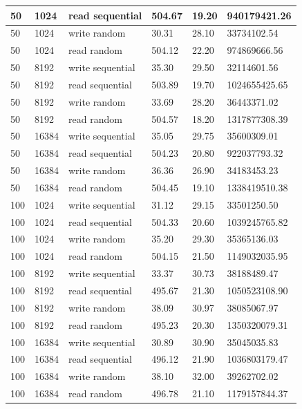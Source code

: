 \begin{tabularx}{\textwidth}{|X|X|X|X|X|X|}
    50 & 1024 & read sequential & 504.67 & 19.20 & 940179421.26 \\
    \hline
    50 & 1024 & write random & 30.31 & 28.10 & 33734102.54 \\
    \hline
    50 & 1024 & read random & 504.12 & 22.20 & 974869666.56 \\
    \hline
    \hline
    \rowcolor{lightgray} 50 & 8192 & write sequential & 35.30 & 29.50 & 32114601.56 \\
    \hline
    \rowcolor{lightgray} 50 & 8192 & read sequential & 503.89 & 19.70 & 1024655425.65 \\
    \hline
    \rowcolor{lightgray} 50 & 8192 & write random & 33.69 & 28.20 & 36443371.02 \\
    \hline
    \rowcolor{lightgray} 50 & 8192 & read random & 504.57 & 18.20 & 1317877308.39 \\
    \hline
    \hline
    50 & 16384 & write sequential & 35.05 & 29.75 & 35600309.01 \\
    \hline
    50 & 16384 & read sequential & 504.23 & 20.80 & 922037793.32 \\
    \hline
    50 & 16384 & write random & 36.36 & 26.90 & 34183453.23 \\
    \hline
    50 & 16384 & read random & 504.45 & 19.10 & 1338419510.38 \\
    \hline
    \hline
    \rowcolor{lightgray} 100 & 1024 & write sequential & 31.12 & 29.15 & 33501250.50 \\
    \hline
    \rowcolor{lightgray} 100 & 1024 & read sequential & 504.33 & 20.60 & 1039245765.82 \\
    \hline
    \rowcolor{lightgray} 100 & 1024 & write random & 35.20 & 29.30 & 35365136.03 \\
    \hline
    \rowcolor{lightgray} 100 & 1024 & read random & 504.15 & 21.50 & 1149032035.95 \\
    \hline
    \hline
    100 & 8192 & write sequential & 33.37 & 30.73 & 38188489.47 \\
    \hline
    100 & 8192 & read sequential & 495.67 & 21.30 & 1050523108.90 \\
    \hline
    100 & 8192 & write random & 38.09 & 30.97 & 38085067.97 \\
    \hline
    100 & 8192 & read random & 495.23 & 20.30 & 1350320079.31 \\
    \hline
    \hline
    \rowcolor{lightgray} 100 & 16384 & write sequential & 30.89 & 30.90 & 35045035.83 \\
    \hline
    \rowcolor{lightgray} 100 & 16384 & read sequential & 496.12 & 21.90 & 1036803179.47 \\
    \hline
    \rowcolor{lightgray} 100 & 16384 & write random & 38.10 & 32.00 & 39262702.02 \\
    \hline
    \rowcolor{lightgray} 100 & 16384 & read random & 496.78 & 21.10 & 1179157844.37 \\
    \hline
    \hline
    \end{tabularx}

